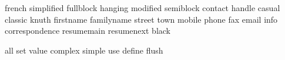             {french}
        {simplified}
         {fullblock}
           {hanging}
          {modified}
         {semiblock}
           {contact}
            {handle}
            {casual}
           {classic}
             {knuth}
         {firstname}
        {familyname}
            {street}
              {town}
            {mobile}
             {phone}
               {fax}
             {email}
              {info}
    {correspondence}
        {resumemain}
        {resumenext}
             {black}
\stopinterface

\startinterface all
               {set}
             {value}
           {complex}
            {simple}
               {use}
            {define}
             {flush}
\stopinterface



\protect \endinput
